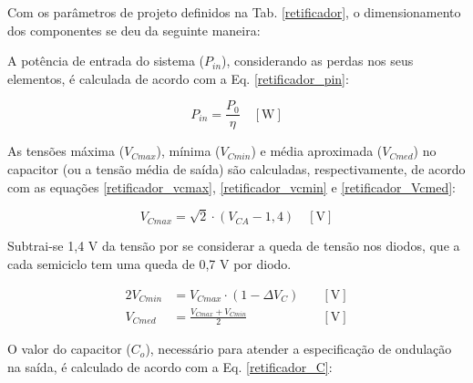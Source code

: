 \begin{apendicesenv}
Com os parâmetros de projeto definidos na Tab. \ref{retificador}, o dimensionamento dos componentes se deu da seguinte maneira:

A potência de entrada do sistema ($P_{in}$), considerando as perdas nos seus elementos, é calculada de acordo com a Eq. \ref{retificador_pin}:
    
    \begin{equation}
        P_{in} = \frac{P_{0}}{\eta} \quad [\text{W}]
        \label{retificador_pin}
    \end{equation}

As tensões máxima ($V_{Cmax}$), mínima ($V_{Cmin}$) e média aproximada ($V_{Cmed}$) no capacitor (ou a tensão média de saída) são calculadas, respectivamente, de acordo com as equações \ref{retificador_vcmax},  \ref{retificador_vcmin} e \ref{retificador_Vcmed}:
    
    \begin{equation}
        V_{Cmax} = \sqrt{2} \cdot \left( V_{CA} - 1,4 \right) \quad [\text{V}]
        \label{retificador_vcmax}
    \end{equation}
    
Subtrai-se 1,4 V da tensão por se considerar a queda de tensão nos diodos, que a cada semiciclo tem uma queda de 0,7 V por diodo.

    
    \begin{alignat}{2}
        \label{retificador_vcmin}
        V_{Cmin} & = V_{Cmax} \cdot \left( 1 - \Delta V_{C}  \right) \quad & [\text{V}] \\
        \label{retificador_Vcmed}
        V_{Cmed} & = \frac{V_{Cmax} + V_{Cmin}}{2} \quad & [\text{V}]
    \end{alignat}
    
    
    
O valor do capacitor ($C_{o}$), necessário para atender a especificação de ondulação na saída, é calculado de acordo com a Eq. \ref{retificador_C}:
    

\end{apendicesenv}
